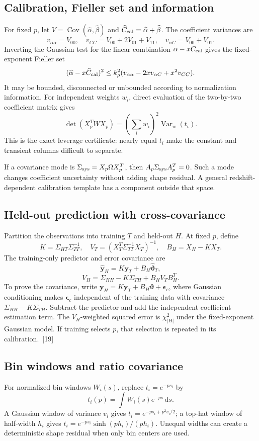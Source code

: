 \documentclass[10pt,twocolumn,letterpaper]{article}
\newcommand{\dd}{\mathrm{d}}
\newcommand{\Var}{\operatorname{Var}}
\newcommand{\Cov}{\operatorname{Cov}}
\begin{document}
\subsection{Calibration, Fieller set and information}
For fixed $p$, let $V=\Cov(\widehat\alpha,\widehat\beta)$ and $\widehat C_{\rm cal}=\widehat\alpha+\widehat\beta$. The coefficient variances are
\[
 v_{\alpha\alpha}=V_{00},\quad
 v_{CC}=V_{00}+2V_{01}+V_{11},\quad
 v_{\alpha C}=V_{00}+V_{01}.
\]
Inverting the Gaussian test for the linear combination $\alpha-xC_{\rm cal}$ gives the fixed-exponent Fieller set
\[
 (\widehat\alpha-x\widehat C_{\rm cal})^2
 \le k_\rho^2(v_{\alpha\alpha}-2xv_{\alpha C}+x^2v_{CC}).
\]
It may be bounded, disconnected or unbounded according to normalization information. For independent weights $w_i$, direct evaluation of the two-by-two coefficient matrix gives
\[
 \det(X_p^TWX_p)=\left(\sum_iw_i\right)^2\Var_w(t_i).
\]
This is the exact leverage certificate: nearly equal $t_i$ make the constant and transient columns difficult to separate.

If a covariance mode is $\Sigma_{\rm sys}=X_p\Omega X_p^T$, then $A_p\Sigma_{\rm sys}A_p^T=0$. Such a mode changes coefficient uncertainty without adding shape residual. A general redshift-dependent calibration template has a component outside that space.

\subsection{Held-out prediction with cross-covariance}
Partition the observations into training $T$ and held-out $H$. At fixed $p$, define
\[
 K=\Sigma_{HT}\Sigma_{TT}^{-1},\quad
 V_T=(X_T^T\Sigma_{TT}^{-1}X_T)^{-1},\quad
 B_H=X_H-KX_T.
\]
The training-only predictor and error covariance are
\[
 \widehat{\bm y}_H=K\bm y_T+B_H\widehat{\bm\vartheta}_T,
\]
\[
 V_H=\Sigma_{HH}-K\Sigma_{TH}+B_HV_TB_H^T.
\]
To prove the covariance, write $\bm y_H=K\bm y_T+B_H\bm\vartheta+\bm\epsilon_c$, where Gaussian conditioning makes $\bm\epsilon_c$ independent of the training data with covariance $\Sigma_{HH}-K\Sigma_{TH}$. Subtract the predictor and add the independent coefficient-estimation term. The $V_H$-weighted squared error is $\chi^2_{|H|}$ under the fixed-exponent Gaussian model. If training selects $p$, that selection is repeated in its calibration.~[19]

\subsection{Bin windows and ratio covariance}
For normalized bin windows $W_i(s)$, replace $t_i=e^{-ps_i}$ by
\[
 t_i(p)=\int W_i(s)e^{-ps}\,\dd s.
\]
A Gaussian window of variance $v_i$ gives $t_i=e^{-ps_i+p^2v_i/2}$; a top-hat window of half-width $h_i$ gives $t_i=e^{-ps_i}\sinh(ph_i)/(ph_i)$. Unequal widths can create a deterministic shape residual when only bin centers are used.
\end{document}
